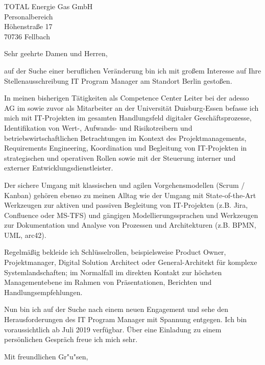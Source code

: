 \documentclass[10pt,a4paper]{dinbrief}
\date{\today}
\begin{document}
 
\begin{letter}  
{%
	TOTAL Energie Gas GmbH\\
	Personalbereich\\
	Höhenstraße 17\\
	70736 Fellbach
}
\subject{\bf Bewerbung IT Program Manager}
\opening{Sehr geehrte Damen und Herren,}
auf der Suche einer beruflichen Veränderung bin ich mit großem Interesse auf Ihre Stellenausschreibung IT Program Manager am Standort Berlin gestoßen. 

In meinen bisherigen Tätigkeiten als Competence Center Leiter bei der adesso AG im sowie zuvor als Mitarbeiter an der Universität Duisburg-Essen befasse ich mich mit IT-Projekten im gesamten Handlungsfeld digitaler Geschäftsprozesse, Identifikation von Wert-, Aufwands- und Risikotreibern und betriebswirtschaftlichen Betrachtungen im Kontext des Projektmanagements, Requirements Engineering, Koordination und Begleitung von IT-Projekten in strategischen und operativen Rollen  sowie mit der Steuerung interner und externer Entwicklungsdienstleister.

Der sichere Umgang mit klassischen und agilen Vorgehensmodellen (Scrum / Kanban) gehören ebenso zu meinen Alltag wie der Umgang mit State-of-the-Art Werkzeugen zur aktiven und passiven Begleitung von IT-Projekten (z.B. Jira, Confluence oder MS-TFS) und gängigen  Modellierungssprachen und Werkzeugen zur Dokumentation und Analyse von Prozessen und Architekturen (z.B. BPMN, UML, arc42).

Regelmäßig bekleide ich Schlüsselrollen, beispielsweise Product Owner, Projektmanager, Digital Solution Architect oder General-Architekt für komplexe Systemlandschaften; im Normalfall im direkten Kontakt zur höchsten Managementebene im Rahmen von Präsentationen, Berichten und Handlungsempfehlungen.

Nun bin ich auf der Suche nach einem neuen Engagement und sehe den Herausforderungen des IT Program Manager mit Spannung entgegen. Ich bin voraussichtlich ab Juli 2019 verfügbar. Über eine Einladung zu einem persönlichen Gespräch freue ich mich sehr.
\closing{Mit freundlichen Gr"u"sen,}
\end{letter}
\end{document}
